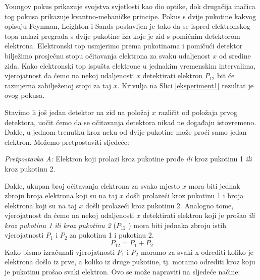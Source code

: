 \documentclass[twoside]{article}
\begin{document}
Youngov pokus prikazuje svojstva svjetlosti kao dio optike, dok drugačija inačica tog pokusa prikazuje kvantno-mehaničke principe. Pokus s dvije pukotine kakvog opisuju Feynman, Leighton i Sands \cite{Feynman2010} postavljen je tako da se ispred elektronskog topa nalazi pregrada s dvije pukotine iza koje je zid s pomičnim detektorom elektrona. Elektronski top usmjerimo prema pukotinama i pomičući detektor bilježimo prosječnu stopu očitavanja elektrona za svaku udaljenost $x$ od sredine zida. Kako elektronski top ispušta elektrone u jednakim vremenskim intervalima, vjerojatnost da ćemo na nekoj udaljenosti $x$ detektirati elektron $P_{12}$  bit će razmjerna zabilježenoj stopi za taj $x$. Krivulja na Slici \ref{eksperiment1} rezultat je ovog pokusa.

Stavimo li još jedan detektor na zid na položaj $x$ različit od položaja prvog detektora, uočit ćemo da se očitavanja detektora nikad ne događaju istovremeno. Dakle, u jednom trenutku kroz neku od dvije pukotine može proći samo jedan elektron. Možemo pretpostaviti sljedeće:
\begin{displayquote}
\emph{Pretpostavka A:} Elektron koji prolazi kroz pukotine prođe \emph{ili} kroz pukotinu 1 \emph{ili} kroz pukotinu 2.
\end{displayquote}
Dakle, ukupan broj očitavanja elektrona za svako mjesto $x$ mora biti jednak zbroju broja elektrona koji su na taj $x$ došli prolazeći kroz pukotinu 1 i broja elektrona koji su na taj $x$ došli prolazeći kroz pukotinu 2. Analogno tome, vjerojatnost da ćemo na nekoj udaljenosti $x$ detektirati elektron koji je prošao \emph{ili kroz pukotinu 1 ili kroz pukotinu 2} ($P_{12}$ ) mora biti jednaka zbroju istih vjerojatnosti $P_1$ i $P_2$ za pukotinu 1 i pukotinu 2.
\[ P_{12} = P_1 + P_2\]
Kako bismo izračunali vjerojatnosti $P_1$ i $P_2$ moramo za svaki x odrediti koliko je elektrona došlo iz prve, a koliko iz druge pukotine, tj. moramo odrediti kroz koju je pukotinu prošao svaki elektron. Ovo se može napraviti na sljedeće načine:
\end{document}
